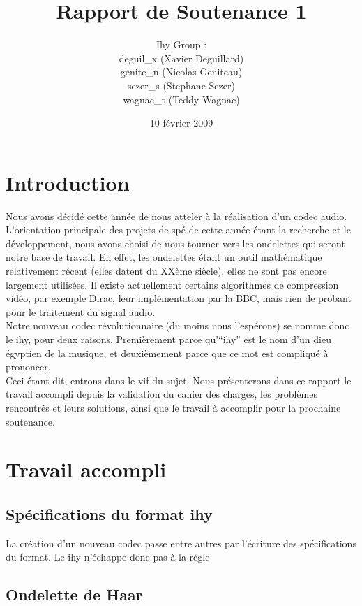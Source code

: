 \documentclass[a4paper,12pt]{article}
\title{Rapport de Soutenance 1}
\author{
Ihy Group : \\
deguil\_x (Xavier Deguillard)\\
genite\_n (Nicolas Geniteau)\\
sezer\_s (Stephane Sezer)\\
wagnac\_t (Teddy Wagnac)
}
\date{10 f\'evrier 2009}
\begin{document}
\maketitle

\newpage

\section*{Introduction}
Nous avons  décidé cette  année de  nous atteler  à la  réalisation d'un
codec audio.  L'orientation principale des projets de spé de cette année
étant  la recherche  et le  développement,  nous  avons  choisi  de nous
tourner vers les ondelettes qui seront notre base de travail.  En effet,
les ondelettes  étant un outil  mathématique relativement  récent (elles
datent du XXème siècle),  elles ne  sont pas encore largement utilisées.
Il existe  actuellement certains algorithmes  de compression vidéo,  par
exemple Dirac, leur implémentation par la BBC, mais rien de probant pour
le traitement du signal audio.\\
Notre nouveau codec révolutionnaire (du  moins nous l'espérons) se nomme
donc le  ihy,  pour deux raisons.  Premièrement parce  qu'``ihy'' est le
nom d'un dieu égyptien de la  musique,  et deuxièmement parce que ce mot
est compliqué à prononcer.\\
Ceci étant dit, entrons dans le vif du sujet.  Nous présenterons dans ce
rapport le travail accompli depuis  la validation du cahier des charges,
les problèmes  rencontrés et  leurs solutions,  ainsi  que le  travail à
accomplir pour la prochaine soutenance.

\newpage

\tableofcontents

\newpage

\section{Travail accompli}

	\subsection{Spécifications du format ihy}
La création d'un nouveau codec passe entre autres par l'écriture des
spécifications du format. Le ihy n'échappe donc pas à la règle

	\subsection{Ondelette de Haar}
\end{document}
